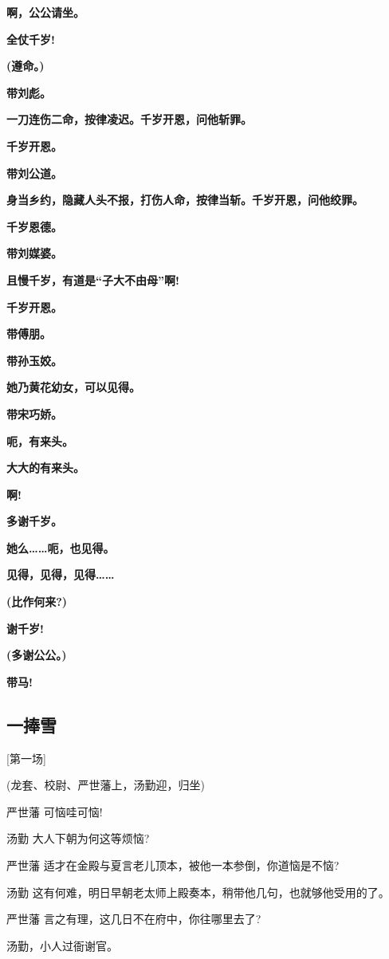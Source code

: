 \textbf{啊，公公请坐。}

\textbf{全仗千岁!}

\textbf{(遵命。)}

\textbf{带刘彪。}

\textbf{一刀连伤二命，按律凌迟。千岁开恩，问他斩罪。}

\textbf{千岁开恩。}

\textbf{带刘公道。}

\textbf{身当乡约，隐藏人头不报，打伤人命，按律当斩。千岁开恩，问他绞罪。}

\textbf{千岁恩德。}

\textbf{带刘媒婆。}

\textbf{且慢千岁，有道是``子大不由母''啊!}

\textbf{千岁开恩。}

\textbf{带傅朋。}

\textbf{带孙玉姣。}

\textbf{她乃黄花幼女，可以见得。}

\textbf{带宋巧娇。}

\textbf{呃，有来头。}

\textbf{大大的有来头。}

\textbf{啊!}

\textbf{多谢千岁。}

\textbf{她么\ldots{}\ldots{}呃，也见得。}

\textbf{见得，见得，见得\ldots{}\ldots{}}

\textbf{(比作何来?)}

\textbf{谢千岁!}

\textbf{(多谢公公。)}

\textbf{带马!}

\newpage
\hypertarget{ux4e00ux6367ux96ea}{%
\subsection{一捧雪}\label{ux4e00ux6367ux96ea}}

{[}第一场{]}

(龙套、校尉、严世藩上，汤勤迎，归坐)

严世藩 可恼哇可恼!

汤勤 大人下朝为何这等烦恼?

严世藩 适才在金殿与夏言老儿顶本，被他一本参倒，你道恼是不恼?

汤勤 这有何难，明日早朝老太师上殿奏本，稍带他几句，也就够他受用的了。

严世藩 言之有理，这几日不在府中，你往哪里去了?

汤勤，小人过衙谢官。

